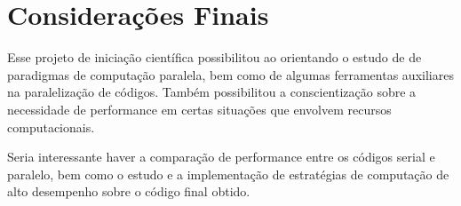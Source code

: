 \chapter{Considerações Finais}

Esse projeto de iniciação científica possibilitou ao orientando o estudo de de paradigmas de computação paralela, bem como de algumas ferramentas auxiliares na paralelização de códigos. Também possibilitou a conscientização sobre a necessidade de performance em certas situações que envolvem recursos computacionais.

Seria interessante haver a comparação de performance entre os códigos serial e paralelo, bem como o estudo e a implementação de estratégias de computação de alto desempenho sobre o código final obtido.